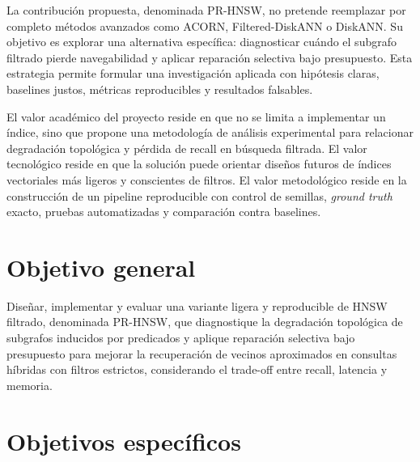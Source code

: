 La contribución propuesta, denominada PR-HNSW, no pretende reemplazar por completo métodos avanzados como ACORN, Filtered-DiskANN o DiskANN. Su objetivo es explorar una alternativa específica: diagnosticar cuándo el subgrafo filtrado pierde navegabilidad y aplicar reparación selectiva bajo presupuesto. Esta estrategia permite formular una investigación aplicada con hipótesis claras, baselines justos, métricas reproducibles y resultados falsables.

El valor académico del proyecto reside en que no se limita a implementar un índice, sino que propone una metodología de análisis experimental para relacionar degradación topológica y pérdida de recall en búsqueda filtrada. El valor tecnológico reside en que la solución puede orientar diseños futuros de índices vectoriales más ligeros y conscientes de filtros. El valor metodológico reside en la construcción de un pipeline reproducible con control de semillas, \textit{ground truth} exacto, pruebas automatizadas y comparación contra baselines.

\section{Objetivo general}

Diseñar, implementar y evaluar una variante ligera y reproducible de HNSW filtrado, denominada PR-HNSW, que diagnostique la degradación topológica de subgrafos inducidos por predicados y aplique reparación selectiva bajo presupuesto para mejorar la recuperación de vecinos aproximados en consultas híbridas con filtros estrictos, considerando el trade-off entre recall, latencia y memoria.

\section{Objetivos específicos}

